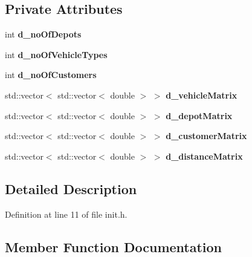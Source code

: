 \subsection*{Private Attributes}
\begin{DoxyCompactItemize}
\item 
\mbox{\label{class_init_a44d05451df796d69ecc558837ecb7105}} 
int {\bfseries d\+\_\+no\+Of\+Depots}
\item 
\mbox{\label{class_init_a636841b2dccedbe95e966d59452c4585}} 
int {\bfseries d\+\_\+no\+Of\+Vehicle\+Types}
\item 
\mbox{\label{class_init_ab31f6ee0c02edc45d78d0e90a89ba45a}} 
int {\bfseries d\+\_\+no\+Of\+Customers}
\item 
\mbox{\label{class_init_a3d56c67f9c6ba79f0fc2252bbc964345}} 
std\+::vector$<$ std\+::vector$<$ double $>$ $>$ {\bfseries d\+\_\+vehicle\+Matrix}
\item 
\mbox{\label{class_init_a3472bd129b55c09b49cfcccae49b7d6b}} 
std\+::vector$<$ std\+::vector$<$ double $>$ $>$ {\bfseries d\+\_\+depot\+Matrix}
\item 
\mbox{\label{class_init_a17dd120f45612ac00015ab0650025afc}} 
std\+::vector$<$ std\+::vector$<$ double $>$ $>$ {\bfseries d\+\_\+customer\+Matrix}
\item 
\mbox{\label{class_init_a602b213bdcdaecbaa1ebfb134930ad33}} 
std\+::vector$<$ std\+::vector$<$ double $>$ $>$ {\bfseries d\+\_\+distance\+Matrix}
\end{DoxyCompactItemize}


\subsection{Detailed Description}


Definition at line 11 of file init.\+h.



\subsection{Member Function Documentation}
\mbox{\label{class_init_a99ac0859d92852b421f4fc13973d9a70}} 
